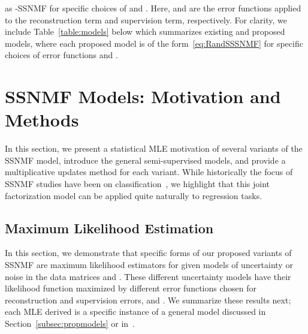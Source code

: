 \documentclass[twocolumn,10pt]{article}
\begin{document}
 
as -SSNMF for specific choices of  and . Here,  and  are the error functions applied to the reconstruction term and supervision term, respectively. 
For clarity, we include Table~\ref{table:models} below which summarizes existing and proposed models, where each proposed model is of the form~\eqref{eq:RandSSSNMF} for specific choices of error functions  and .
\begin{table}[tb] 
\caption{Overview of NMF and SSNMF models.}\label{table:models}
{ \renewcommand{\arraystretch}{1.15}
}
\end{table}

\section{SSNMF Models: Motivation and Methods}
\label{sec: I-SSNMF method}
In this section, we present a statistical MLE motivation of several variants of the SSNMF model, introduce the general semi-supervised models, and provide a multiplicative updates method for each variant.
While historically the focus of SSNMF studies have been on classification~\cite{lee2009semi}, 
we highlight that this joint factorization model can be applied quite naturally to 
regression tasks. 

\subsection{Maximum Likelihood Estimation}\label{subsec:MLE}
In this section, we demonstrate that specific forms of our proposed variants of SSNMF are maximum likelihood estimators for given models of uncertainty or noise in the data matrices  and .  These different uncertainty models have their likelihood function maximized by 
different error functions chosen for reconstruction and supervision errors,  and .  We summarize these results next; each MLE derived is a specific instance of a general model discussed in Section~\ref{subsec:propmodels} or in~\cite{lee2009semi}.
\end{document}
